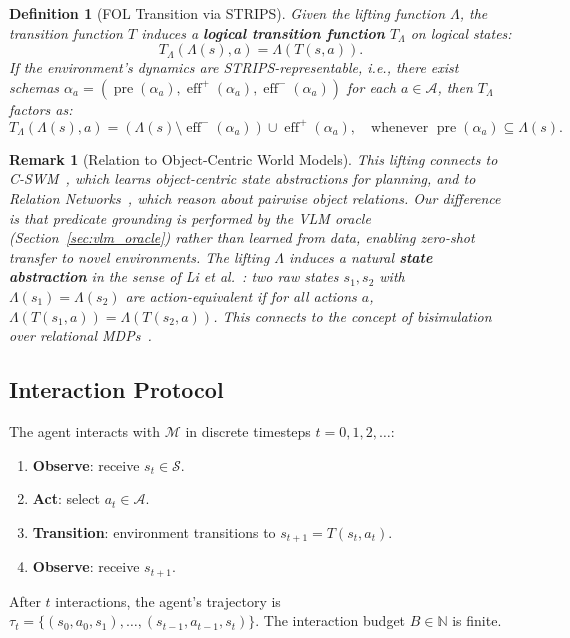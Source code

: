 \documentclass{article}
\newtheorem{definition}{Definition}
\newtheorem{remark}{Remark}
\DeclareMathOperator{\pre}{pre}
\DeclareMathOperator{\eff}{eff}
\newcommand{\calS}{\mathcal{S}}
\newcommand{\calA}{\mathcal{A}}
\newcommand{\calM}{\mathcal{M}}
\newcommand{\bbN}{\mathbb{N}}
\begin{document}
\begin{definition}[FOL Transition via STRIPS]
\label{def:fol_transition}
Given the lifting function $\Lambda$, the transition function $T$ induces a \textbf{logical transition function} $T_\Lambda$ on logical states:
\begin{equation}
T_\Lambda(\Lambda(s), a) = \Lambda(T(s, a)).
\end{equation}
If the environment's dynamics are \emph{STRIPS-representable}, i.e., there exist schemas $\alpha_a = (\pre(\alpha_a), \eff^+(\alpha_a), \eff^-(\alpha_a))$ for each $a \in \calA$, then $T_\Lambda$ factors as:
\begin{equation}
T_\Lambda(\Lambda(s), a) = (\Lambda(s) \setminus \eff^-(\alpha_a)) \cup \eff^+(\alpha_a), \quad \text{whenever } \pre(\alpha_a) \subseteq \Lambda(s).
\end{equation}

\end{definition}

\begin{remark}[Relation to Object-Centric World Models]
This lifting connects to C-SWM~\cite{kipf2020contrastive}, which learns object-centric state abstractions for planning, and to Relation Networks~\cite{santoro2017simple}, which reason about pairwise object relations.  Our difference is that predicate grounding is performed by the VLM oracle (Section~\ref{sec:vlm_oracle}) rather than learned from data, enabling zero-shot transfer to novel environments.  The lifting $\Lambda$ induces a natural \textbf{state abstraction} in the sense of Li et al.~\cite{li2006towards}: two raw states $s_1, s_2$ with $\Lambda(s_1) = \Lambda(s_2)$ are \emph{action-equivalent} if for all actions $a$, $\Lambda(T(s_1, a)) = \Lambda(T(s_2, a))$.  This connects to the concept of \emph{bisimulation} over relational MDPs~\cite{givan2003equivalence}.
\end{remark}

\subsection{Interaction Protocol}
\label{sec:protocol}

The agent interacts with $\calM$ in discrete timesteps $t = 0, 1, 2, \ldots$:
\begin{enumerate}[nosep]
    \item \textbf{Observe}: receive $s_t \in \calS$.
    \item \textbf{Act}: select $a_t \in \calA$.
    \item \textbf{Transition}: environment transitions to $s_{t+1} = T(s_t, a_t)$.
    \item \textbf{Observe}: receive $s_{t+1}$.
\end{enumerate}
After $t$ interactions, the agent's trajectory is $\tau_t = \{(s_0, a_0, s_1), \ldots, (s_{t-1}, a_{t-1}, s_t)\}$.  The interaction budget $B \in \bbN$ is finite.
\end{document}
